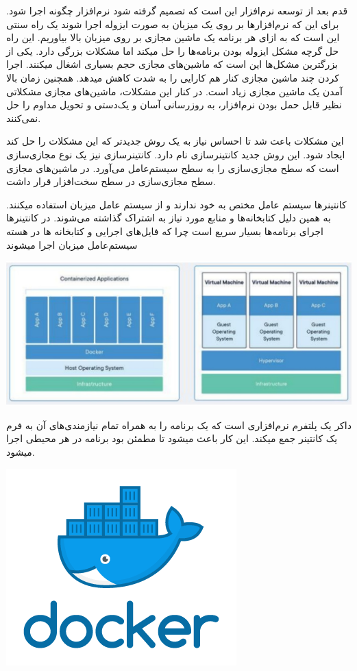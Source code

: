 \documentclass[a4]{report}
\begin{document}

قدم بعد از توسعه نرم‌افزار این است که تصمیم گرفته شود نرم‌افزار چگونه اجرا شود. برای این که نرم‌افزارها بر روی یک میزبان به صورت ایزوله اجرا شوند یک راه سنتی این است که به ازای هر برنامه یک ماشین مجازی
بر روی میزبان بالا بیاوریم. این راه حل گرچه مشکل ایزوله بودن برنامه‌ها را حل میکند اما مشکلات بزرگی دارد.
یکی از بزرگترین مشکل‌ها این است که ماشین‌های مجازی حجم بسیاری اشغال میکنند. اجرا کردن چند ماشین
مجازی کنار هم کارایی را به شدت کاهش میدهد. همچنین زمان بالا آمدن یک ماشین مجازی زیاد است. در کنار این مشکلات، ماشین‌های مجازی مشکلاتی نظیر قابل حمل بودن نرم‌افزار، به روز‌رسانی آسان و یک‌دستی و تحویل مداوم را حل نمی‌کنند.

این مشکلات باعث شد تا احساس نیاز به یک روش جدیدتر که این مشکلات را حل کند ایجاد شود. این روش جدید کانتینرسازی نام دارد. کانتینرسازی نیز یک نوع مجازی‌سازی است که سطح مجازی‌سازی را به سطح سیستم‌عامل می‌آورد. در ماشین‌های مجازی سطح مجازی‌سازی در سطح سخت‌افزار قرار داشت.

کانتینرها سیستم عامل مختص به خود ندارند و از سیستم عامل میزبان استفاده میکنند. به همین دلیل
کتابخانه‌ها و منابع مورد نیاز به اشتراک گذاشته می‌شوند. در کانتینرها اجرای برنامه‌ها بسیار سریع است چرا که
فایل‌های اجرایی و کتابخانه ها در هسته سیستم‌عامل میزبان اجرا میشوند

\includegraphics[scale=0.5]{fig/vm}

داکر یک پلتفرم نرم‌افزاری است که یک برنامه را به همراه تمام نیازمندی‌های آن به فرم یک کانتینر جمع
میکند. این کار باعث میشود تا مطمئن بود برنامه در هر محیطی اجرا میشود.

\includegraphics[scale=0.5]{fig/docker}
\end{document}
